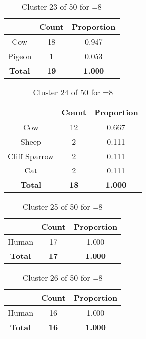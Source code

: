 \begin{table}[ht!]
\centering
\begin{tabular}{|c|c|c|}
\hline
\bf \Spec{} &\bf Count &\bf Proportion\\ \hline \hline
Cow & 18 & 0.947\\ \hline
Pigeon & 1 & 0.053\\ \hline
\hline
\bf Total & \bf 19 & \bf 1.000\\ \hline
\end{tabular}
\label{tab:cluster:23:8}
\caption{Cluster 23 of 50 for \minneigh{}=8}
\end{table}

\begin{table}[ht!]
\centering
\begin{tabular}{|c|c|c|}
\hline
\bf \Spec{} &\bf Count &\bf Proportion\\ \hline \hline
Cow & 12 & 0.667\\ \hline
Sheep & 2 & 0.111\\ \hline
Cliff Sparrow & 2 & 0.111\\ \hline
Cat & 2 & 0.111\\ \hline
\hline
\bf Total & \bf 18 & \bf 1.000\\ \hline
\end{tabular}
\label{tab:cluster:24:8}
\caption{Cluster 24 of 50 for \minneigh{}=8}
\end{table}

\begin{table}[ht!]
\centering
\begin{tabular}{|c|c|c|}
\hline
\bf \Spec{} &\bf Count &\bf Proportion\\ \hline \hline
Human & 17 & 1.000\\ \hline
\hline
\bf Total & \bf 17 & \bf 1.000\\ \hline
\end{tabular}
\label{tab:cluster:25:8}
\caption{Cluster 25 of 50 for \minneigh{}=8}
\end{table}

\begin{table}[ht!]
\centering
\begin{tabular}{|c|c|c|}
\hline
\bf \Spec{} &\bf Count &\bf Proportion\\ \hline \hline
Human & 16 & 1.000\\ \hline
\hline
\bf Total & \bf 16 & \bf 1.000\\ \hline
\end{tabular}
\label{tab:cluster:26:8}
\caption{Cluster 26 of 50 for \minneigh{}=8}
\end{table}

